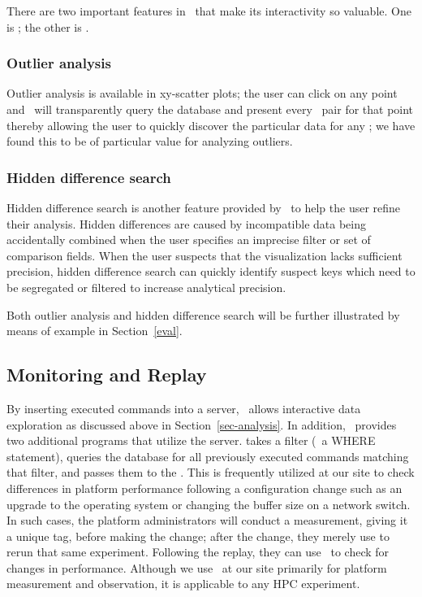 There are two important features in \dbviz\ that make its interactivity so
valuable.  One is ; the other is .  

\subsubsection{Outlier analysis}
Outlier analysis is available in xy-scatter plots; the user can click
on any point and \dbviz\ will transparently query the database and present
every \kv\ pair for that point thereby allowing the user to quickly discover
the particular data for any \sub; we have found this to be of particular value
for analyzing outliers.  

\subsubsection{Hidden difference search}
Hidden difference search is another feature provided
by \dbviz\ to help the user refine their analysis.  Hidden differences are
caused by incompatible data being accidentally combined when the user specifies
an imprecise filter or set of comparison fields.  When the user suspects that
the visualization lacks sufficient precision, hidden difference search can
quickly identify suspect keys which need to be segregated or filtered to
increase analytical precision.

Both outlier analysis and
hidden difference search will be further illustrated by means of example in
Section~\ref{eval}.

\subsection{Monitoring and Replay}

By inserting executed commands into a  server, \name\ allows
interactive data exploration as discussed above in Section~\ref{sec-analysis}.
In addition, \name\ provides two additional programs that utilize the
 server.   takes a  filter (\ie\ a
WHERE statement), queries the database for all previously executed commands
matching that filter, and passes them to the \dispatcher.  This is frequently
utilized at our site to check differences in platform performance following a
configuration change such as an upgrade to the operating system or changing the
buffer size on a network switch.  In such cases, the platform administrators
will conduct a measurement, giving it a unique tag, before making the change;
after the change, they merely use  to rerun that same
experiment.  Following the replay, they can use \dbviz\ to check for changes in
performance.  Although we use \name\ at our site primarily for platform
measurement and observation, it is applicable to any HPC experiment.  

